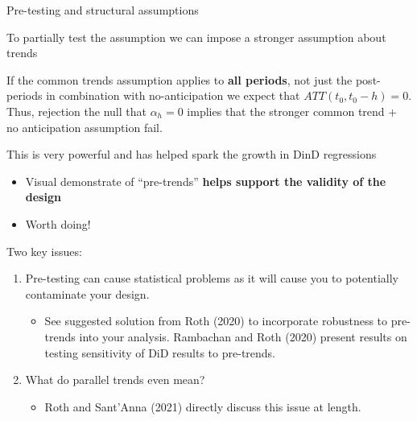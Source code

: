 \documentclass[notes,11pt, aspectratio=169]{beamer}
\newenvironment{wideitemize}{\itemize\addtolength{\itemsep}{10pt}}{\enditemize}
\begin{document}
\begin{frame}{Pre-testing and structural assumptions}
  \begin{wideitemize}
  \item To partially test the assumption we can impose a stronger assumption about trends
      \begin{wideitemize}
      \item If the common trends assumption applies to \textbf{all periods}, not just the post-periods in combination with no-anticipation we expect that $ATT(t_0,t_0-h)=0$. Thus, rejection the null that $\alpha_h=0$ implies that the stronger common trend + no anticipation assumption fail.
      \end{wideitemize}
      \item This is very powerful and has helped spark the growth in DinD regressions
    \begin{itemize}
    \item Visual demonstrate of ``pre-trends''\textbf{ helps support the validity of the design}
    \item Worth doing!
    \end{itemize}
  \item Two key issues:
    \begin{enumerate}
    \item Pre-testing can cause statistical problems as it will cause you to potentially contaminate your
      design.
    \begin{itemize}
    \item See suggested solution from Roth (2020) to incorporate robustness to
    pre-trends into your analysis. Rambachan and Roth (2020) present
    results on testing sensitivity of DiD results to pre-trends.
    \end{itemize}
    \item What do parallel trends even mean? 
    \begin{itemize}
    \item Roth and Sant'Anna (2021) directly discuss this issue at length.
    \end{itemize}
    \end{enumerate}
  \end{wideitemize}
\end{frame}
\end{document}

